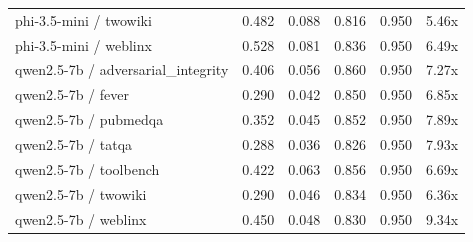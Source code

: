 \begin{table}[h]
\begin{tabular}{l|cc|cc|c}
phi-3.5-mini / twowiki & 0.482 & 0.088 & 0.816 & 0.950 & 5.46x \\
phi-3.5-mini / weblinx & 0.528 & 0.081 & 0.836 & 0.950 & 6.49x \\
qwen2.5-7b / adversarial_integrity & 0.406 & 0.056 & 0.860 & 0.950 & 7.27x \\
qwen2.5-7b / fever & 0.290 & 0.042 & 0.850 & 0.950 & 6.85x \\
qwen2.5-7b / pubmedqa & 0.352 & 0.045 & 0.852 & 0.950 & 7.89x \\
qwen2.5-7b / tatqa & 0.288 & 0.036 & 0.826 & 0.950 & 7.93x \\
qwen2.5-7b / toolbench & 0.422 & 0.063 & 0.856 & 0.950 & 6.69x \\
qwen2.5-7b / twowiki & 0.290 & 0.046 & 0.834 & 0.950 & 6.36x \\
qwen2.5-7b / weblinx & 0.450 & 0.048 & 0.830 & 0.950 & 9.34x \\
\hline
\end{tabular}
\end{table}
